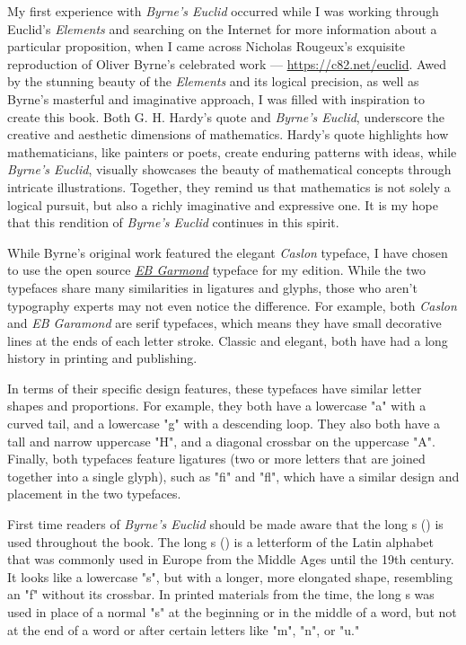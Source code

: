\documentclass[twoside,11pt]{report}
\begin{document}
My first experience with \textit{Byrne’s Euclid} occurred while I was working through Euclid’s \textit{Elements} and searching on the Internet for more information about a particular proposition, when I came across Nicholas Rougeux's exquisite reproduction of Oliver Byrne's celebrated work --- \url{https://c82.net/euclid}.  Awed by the stunning beauty of the \textit{Elements} and its logical precision, as well as Byrne's masterful and imaginative approach, I was filled with inspiration to create this book.  Both G. H. Hardy's quote and \textit{Byrne's Euclid}, underscore the creative and aesthetic dimensions of mathematics. Hardy's quote highlights how mathematicians, like painters or poets, create enduring patterns with ideas, while \textit{Byrne's Euclid}, visually showcases the beauty of mathematical concepts through intricate illustrations. Together, they remind us that mathematics is not solely a logical pursuit, but also a richly imaginative and expressive one.  It is my hope that this rendition of \textit{Byrne's Euclid} continues in this spirit.

While Byrne's original work featured the elegant \textit{Caslon} typeface, I have chosen to use the open source \href{https://github.com/georgd/EB-Garamond}{\textit{EB Garmond}} typeface for my edition. While the two typefaces share many similarities in ligatures and glyphs, those who aren't typography experts may not even notice the difference.  For example, both \textit{Caslon} and \textit{EB Garamond} are serif typefaces, which means they have small decorative lines at the ends of each letter stroke. Classic and elegant, both have had a long history in printing and publishing.

In terms of their specific design features, these typefaces have similar letter shapes and proportions. For example, they both have a lowercase "a" with a curved tail, and a lowercase "g" with a descending loop. They also both have a tall and narrow uppercase "H", and a diagonal crossbar on the uppercase "A".  Finally, both typefaces feature ligatures (two or more letters that are joined together into a single glyph), such as "fi" and "fl", which have a similar design and placement in the two typefaces.

First time readers of \textit{Byrne's Euclid} should be made aware that the long s ({\color{cred}{ſ}}) is used throughout the book. The long s ({\color{cred}{ſ}}) is a letterform of the Latin alphabet that was commonly used in Europe from the Middle Ages until the 19th century. It looks like a lowercase "s", but with a longer, more elongated shape, resembling an "f" without its crossbar. In printed materials from the time, the long s was used in place of a normal "s" at the beginning or in the middle of a word, but not at the end of a word or after certain letters like "m", "n", or "u."
\end{document}
